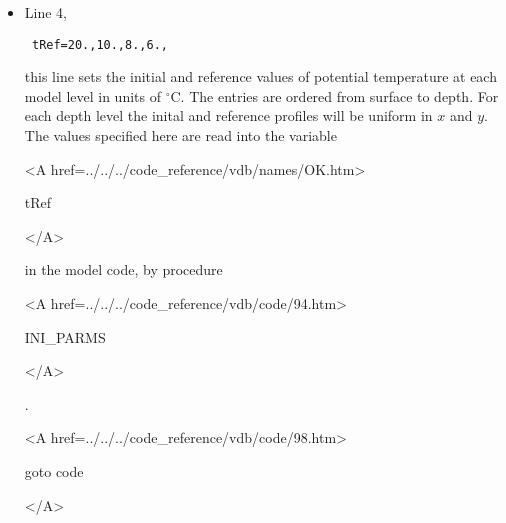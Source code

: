 \begin{itemize}

\item Line 4, 
\begin{verbatim} tRef=20.,10.,8.,6., \end{verbatim} 
this line sets
the initial and reference values of potential temperature at each model
level in units of $^{\circ}$C.
The entries are ordered from surface to depth. For each
depth level the inital and reference profiles will be uniform in
$x$ and $y$. The values specified here are read into the
variable 
{\bf
\begin{rawhtml} <A href=../../../code_reference/vdb/names/OK.htm> \end{rawhtml}
tRef
\begin{rawhtml} </A>\end{rawhtml}
} 
in the model code, by procedure 
{\it
\begin{rawhtml} <A href=../../../code_reference/vdb/code/94.htm> \end{rawhtml}
INI\_PARMS
\begin{rawhtml} </A>\end{rawhtml}
}.

\newcommand{\VARtref}{
{\bf
\begin{rawhtml} <A href=../../../code_reference/vdb/names/OK.htm> \end{rawhtml}
tRef
\begin{rawhtml} </A>\end{rawhtml}
} 
}



{\bf
\begin{rawhtml} <A href=../../../code_reference/vdb/code/98.htm> \end{rawhtml}
goto code
\begin{rawhtml} </A>\end{rawhtml}
}



\end{itemize}
